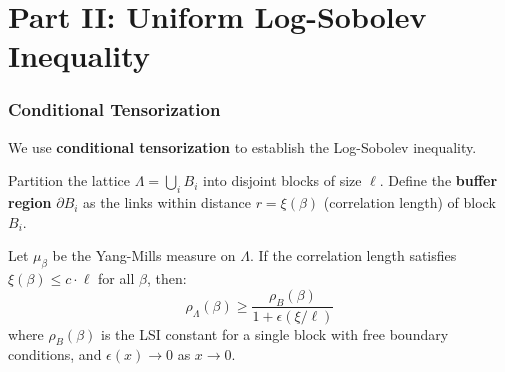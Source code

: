 \part{Part II: Uniform Log-Sobolev Inequality}
\label{part:uniform-lsi}

\section{Conditional Tensorization}
\label{sec:conditional-tensorization}

We use \textbf{conditional tensorization} to establish the Log-Sobolev inequality.

\begin{definition}
\label{def:block-buffer}
Partition the lattice $\Lambda = \bigcup_i B_i$ into disjoint blocks of size $\ell$.
Define the \textbf{buffer region} $\partial B_i$ as the links within distance 
$r = \xi(\beta)$ (correlation length) of block $B_i$.
\end{definition}

\begin{theorem}
\label{thm:conditional-tensorization}
Let $\mu_\beta$ be the Yang-Mills measure on $\Lambda$. 
If the correlation length satisfies $\xi(\beta) \leq c \cdot \ell$ for all $\beta$,
then:
\begin{equation}
\rho_\Lambda(\beta) \geq \frac{\rho_{B}(\beta)}{1 + \epsilon(\xi/\ell)}
\end{equation}
where $\rho_B(\beta)$ is the LSI constant for a single block with free boundary
conditions, and $\epsilon(x) \to 0$ as $x \to 0$.
\end{theorem}

